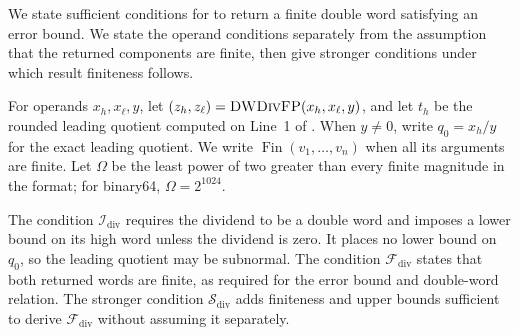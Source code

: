 We state sufficient conditions for \DWDivFP{} to return a finite
double word satisfying an error bound. We state the operand
conditions separately from the assumption that the returned
components are finite, then give stronger conditions under which
result finiteness follows.

For operands $x_h,x_\ell,y$, let
$(z_h,z_\ell)=\textsc{DWDivFP}{}(x_h,x_\ell,y)$, and let $t_h$ be the rounded leading
quotient computed on Line~1 of . When $y\neq0$, write
$q_0=x_h/y$ for the exact leading quotient. We write
$\operatorname{Fin}(v_1,\ldots,v_n)$ when all its arguments are finite. Let
$\Omega$ be the least power of two greater than every finite magnitude in the
format; for binary64, $\Omega=2^{1024}$.


The condition $\mathcal{I}_{\mathrm{div}}$ requires the dividend to be a
double word and imposes a lower bound on its high word unless the dividend is
zero. It places no lower bound on $q_0$, so the leading quotient may be
subnormal. The condition $\mathcal{F}_{\mathrm{div}}$ states that both
returned words are finite, as required for the error bound and double-word
relation. The stronger condition $\mathcal{S}_{\mathrm{div}}$ adds finiteness
and upper bounds sufficient to derive
$\mathcal{F}_{\mathrm{div}}$ without assuming it separately.


